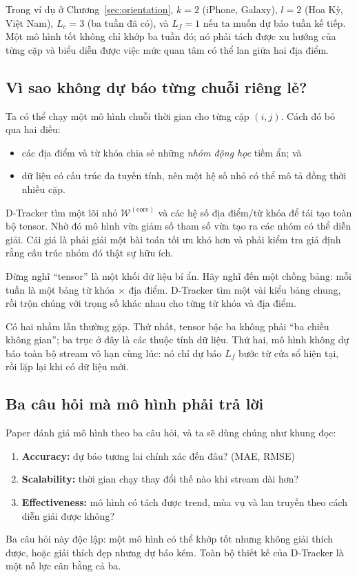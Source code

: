 Trong ví dụ ở Chương~\ref{sec:orientation}, $k=2$ (iPhone, Galaxy), $l=2$ (Hoa Kỳ, Việt Nam),
$L_c=3$ (ba tuần đã có), và $L_f=1$ nếu ta muốn dự báo tuần kế tiếp. Một mô hình tốt không chỉ
khớp ba tuần đó; nó phải tách được xu hướng của từng cặp và biểu diễn được việc mức quan tâm
có thể lan giữa hai địa điểm.

\subsection{Vì sao không dự báo từng chuỗi riêng lẻ?}

Ta có thể chạy một mô hình chuỗi thời gian cho từng cặp $(i,j)$. Cách đó bỏ qua hai điều:
\begin{itemize}
  \item các địa điểm và từ khóa chia sẻ những \emph{nhóm động học} tiềm ẩn; và
  \item dữ liệu có cấu trúc đa tuyến tính, nên một hệ số nhỏ có thể mô tả đồng thời nhiều cặp.
\end{itemize}
D-Tracker tìm một lõi nhỏ $\mathcal{W}^{(\mathrm{core})}$ và các hệ số địa điểm/từ khóa để tái tạo
toàn bộ tensor. Nhờ đó mô hình vừa giảm số tham số vừa tạo ra các nhóm có thể diễn giải. Cái giá
là phải giải một bài toán tối ưu khó hơn và phải kiểm tra giả định rằng cấu trúc nhóm đó thật sự
hữu ích.

\begin{plainwords}
Đừng nghĩ ``tensor'' là một khối dữ liệu bí ẩn. Hãy nghĩ đến một chồng bảng: mỗi tuần là một
bảng từ khóa $\times$ địa điểm. D-Tracker tìm một vài kiểu bảng chung, rồi trộn chúng với trọng
số khác nhau cho từng từ khóa và địa điểm.
\end{plainwords}

\begin{commonmistake}
Có hai nhầm lẫn thường gặp. Thứ nhất, tensor bậc ba không phải ``ba chiều không gian''; ba trục
ở đây là các thuộc tính dữ liệu. Thứ hai, mô hình không dự báo toàn bộ stream vô hạn cùng lúc:
nó chỉ dự báo $L_f$ bước từ cửa sổ hiện tại, rồi lặp lại khi có dữ liệu mới.
\end{commonmistake}

\subsection{Ba câu hỏi mà mô hình phải trả lời}

Paper đánh giá mô hình theo ba câu hỏi, và ta sẽ dùng chúng như khung đọc:
\begin{enumerate}
  \item \textbf{Accuracy:} dự báo tương lai chính xác đến đâu? (MAE, RMSE)
  \item \textbf{Scalability:} thời gian chạy thay đổi thế nào khi stream dài hơn?
  \item \textbf{Effectiveness:} mô hình có tách được trend, mùa vụ và lan truyền theo cách
        diễn giải được không?
\end{enumerate}
Ba câu hỏi này độc lập: một mô hình có thể khớp tốt nhưng không giải thích được, hoặc giải thích
đẹp nhưng dự báo kém. Toàn bộ thiết kế của D-Tracker là một nỗ lực cân bằng cả ba.

